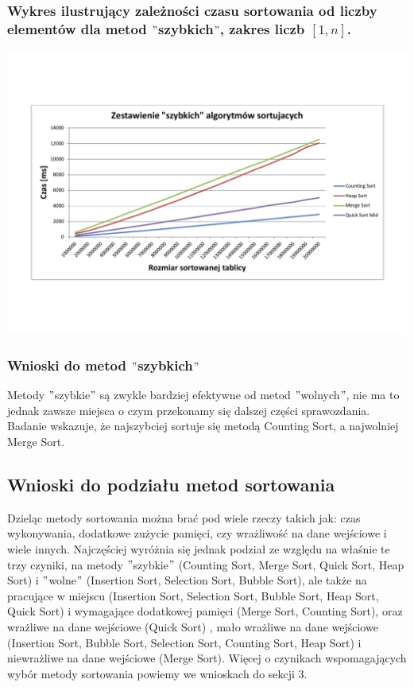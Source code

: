 \documentclass[polish,polish,a4paper]{article}
\begin{document}
\begin{spacing}{1.5}
\subsubsection*{Wykres ilustrujący zależności czasu sortowania od liczby elementów dla metod $"$szybkich$"$, zakres liczb $ [1,n] $.}

	\begin{minipage}[H]{\textwidth}
	\begin{center}
		\includegraphics[scale=0.6]{zad2szybkie.pdf}
		\label{fig:zad2szybkie}
	\end{center}
\end{minipage}

\subsubsection{Wnioski do metod $"$szybkich$"$}

Metody $"$szybkie$"$ są zwykle bardziej efektywne od metod $"$wolnych$"$, nie ma to jednak zawsze miejsca o czym przekonamy się dalszej części sprawozdania. Badanie wskazuje, że najszybciej sortuje się metodą Counting Sort, a najwolniej Merge Sort.


\subsection{Wnioski do podziału metod sortowania}

Dzieląc metody sortowania można brać pod wiele rzeczy takich jak: czas wykonywania, dodatkowe zużycie pamięci, czy wrażliwość na dane wejściowe i wiele innych. Najczęściej wyróżnia się jednak podział ze względu na właśnie te trzy czyniki, na metody $ " $szybkie$ " $ (Counting Sort, Merge Sort, Quick Sort, Heap Sort) i $"$wolne$"$ (Insertion Sort, Selection Sort, Bubble Sort), ale także na pracujące w miejscu (Insertion Sort, Selection Sort, Bubble Sort, Heap Sort, Quick Sort) i wymagające dodatkowej pamięci (Merge Sort, Counting Sort), oraz wrażliwe na dane wejściowe (Quick Sort) , mało wrażliwe na dane wejściowe (Insertion Sort, Bubble Sort, Selection Sort, Counting Sort, Heap Sort) i niewrażliwe na dane wejściowe (Merge Sort). Więcej o czynikach wspomagających wybór metody sortowania powiemy we wnioskach do sekcji 3.



\end{spacing}
\end{document}
